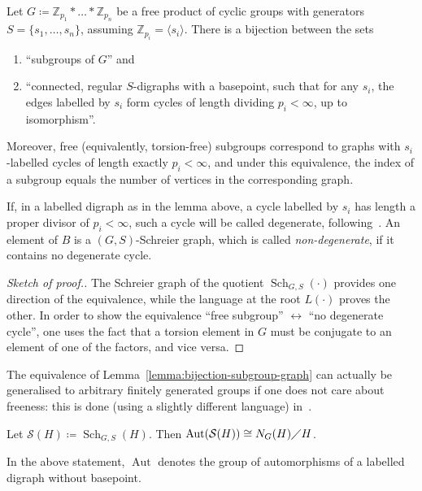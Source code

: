 \documentclass[ALCO,ThmDefs,Unicode,epreuves]{cedram}
\newcommand{\ZZ}{\mathbb{Z}}
\newcommand{\cS}{\mathcal{S}}
\DeclareMathOperator{\Sch}{Sch}
\DeclareMathOperator{\aut}{Aut}
\begin{document}
\begin{lemm}\label{lemma:bijection-subgroup-graph}
Let $G \coloneqq \ZZ_{p_1}* \dots *\ZZ_{p_n}$ be a free product of cyclic groups with generators $S = \{s_1, \dots, s_n\}$, assuming $\ZZ_{p_i} = \langle s_i \rangle$.
 There is a bijection between the sets
 \begin{enumerate}
 \item[$A\coloneqq $] ``subgroups of $G$'' and
 \item[$B\coloneqq $] ``connected, regular $S$-digraphs with a basepoint, such that for any $s_i$, the edges labelled by $s_i$ form cycles of length dividing $p_i < \infty$, up to isomorphism''.
 \end{enumerate}
 Moreover, free (equivalently, torsion-free) subgroups correspond to graphs with $s_i$-labelled cycles of length exactly $p_i < \infty$, and under this equivalence, the index of a subgroup equals the number of vertices in the corresponding graph.
\end{lemm}
If, in a labelled digraph as in the lemma above, a cycle labelled by $s_i$ has length a proper divisor of $p_i < \infty$, such a cycle will be called degenerate, following~\cite{Sto}. An element of $B$ is a $(G,S)$-Schreier graph, which is called \emph{non-degenerate}, if it contains no degenerate cycle.

\begin{proof}[Sketch of proof.]
The Schreier graph of the quotient $\Sch_{G,S}({\cdot})$ provides one direction of the equivalence, while the language at the root $L({\cdot})$ proves the other. In order to show the equivalence ``free subgroup'' $\leftrightarrow $ ``no degenerate cycle'', one uses the fact that a torsion element in $G$ must be conjugate to an element of one of the factors, and vice versa.
\end{proof}

The equivalence of Lemma~\ref{lemma:bijection-subgroup-graph} can actually be generalised to arbitrary finitely generated groups if one does not care about freeness: this is done (using a slightly different language) in~\cite[Theorem~3.5]{We}.

\begin{prop}\label{lemma:N-over-H-as-auto}
Let $\cS(H) \coloneqq \Sch_{G,S}(H)$. Then $\aut(\cS(H)) \cong N_G(H)\diagup H$.
\end{prop}

In the above statement, $\aut$ denotes the group of automorphisms of a labelled digraph without basepoint.
\end{document}
